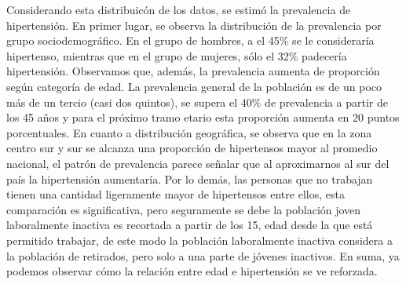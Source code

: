 \documentclass{aa}
\begin{document}
Considerando esta distribuicón de los datos, se estimó la prevalencia de hipertensión. En primer lugar, se observa la distribución de la prevalencia por grupo sociodemográfico. En el grupo de hombres, a el 45\% se le consideraría hipertenso, mientras que en el grupo de mujeres, sólo el 32\% padecería hipertensión. Observamos que, además, la prevalencia aumenta de proporción según categoría de edad. La prevalencia general de la población es de un poco más de un tercio (casi dos quintos), se supera el 40\% de prevalencia a partir de los 45 años y para el próximo tramo etario esta proporción aumenta en 20 puntos porcentuales. En cuanto a distribución geográfica, se observa que en la zona centro sur y sur se alcanza una proporción de hipertensos mayor al promedio nacional, el patrón de prevalencia parece señalar que al aproximarnos al sur del país la hipertensión aumentaría. Por lo demás, las personas que no trabajan tienen una cantidad ligeramente mayor de hipertensos entre ellos, esta comparación es significativa, pero seguramente se debe la población joven laboralmente inactiva es recortada a partir de los 15, edad desde la que está permitido trabajar, de este modo la población laboralmente inactiva considera a la población de retirados, pero solo a una parte de jóvenes inactivos. En suma, ya podemos observar cómo la relación entre edad e hipertensión se ve reforzada.
\end{document}
